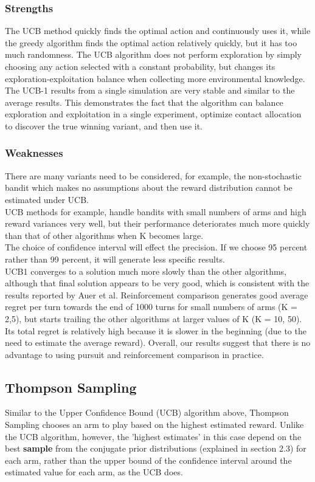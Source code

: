 \subsubsection{Strengths}
The UCB method quickly finds the optimal action and continuously uses it, while the greedy algorithm finds the optimal action relatively quickly, but it has too much randomness.
The UCB algorithm does not perform exploration by simply choosing any action selected with a constant probability, but changes its exploration-exploitation balance when collecting more environmental knowledge.
\\The UCB-1 results from a single simulation are very stable and similar to the average results. This demonstrates the fact that the algorithm can balance exploration and exploitation in a single experiment, optimize contact allocation to discover the true winning variant, and then use it.

\subsubsection{Weaknesses}
There are many variants need to be considered, for example, the non-stochastic bandit which makes no assumptions about the reward distribution cannot be estimated under UCB.
\\UCB methods for example, handle bandits with small numbers of arms and high reward variances very well, but their performance deteriorates much more quickly than that of other algorithms when K becomes large.\citep{Kuleshov}
\\The choice of confidence interval will effect the precision. If we choose 95 percent rather than 99 percent, it will generate less specific results.
\\UCB1 converges to a solution much more slowly than the other algorithms, although that final solution appears to be very good, which is consistent with the results reported by Auer et al. Reinforcement comparison generates good average regret per turn towards the end of 1000 turns for small numbers of arms (K = 2,5), but starts trailing the other algorithms at larger values of K (K = 10, 50). Its total regret is relatively high because it is slower in the beginning (due to the need to estimate the average reward). Overall, our results suggest that there is no advantage to using pursuit and reinforcement comparison in practice. \citep{Kuleshov}

\subsection{Thompson Sampling}
Similar to the Upper Confidence Bound (UCB) algorithm above, Thompson Sampling chooses an arm to play based on the highest estimated reward. Unlike the UCB algorithm, however, the 'highest estimates' in this case depend on the best \textbf{sample} from the conjugate prior distributions (explained in section 2.3) for each arm, rather than the upper bound of the confidence interval around the estimated value for each arm, as the UCB does.

